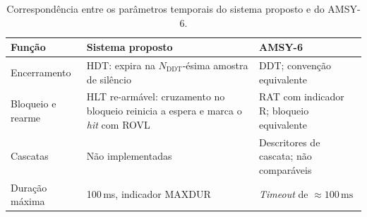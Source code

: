 \begin{table}[htbp]
	\centering
	\small
	\caption{Correspondência entre os parâmetros temporais do sistema proposto e do AMSY-6.}
	\label{tab:parametros_temporizacao}
	\begin{tabular}{L{0.20\textwidth}L{0.34\textwidth}L{0.36\textwidth}}
		\toprule
		\textbf{Função} & \textbf{Sistema proposto} & \textbf{AMSY-6} \\
		\midrule
		Encerramento & HDT: expira na \(N_{\mathrm{DDT}}\)-ésima amostra de silêncio & DDT; convenção equivalente \\
		Bloqueio e rearme & HLT re-armável: cruzamento no bloqueio reinicia a espera e marca o \textit{hit} com ROVL & RAT com indicador R; bloqueio equivalente \\
		Cascatas & Não implementadas & Descritores de cascata; não comparáveis \\
		Duração máxima & 100\,ms, indicador MAXDUR & \textit{Timeout} de \(\approx 100\,\mathrm{ms}\) \\
		\bottomrule
	\end{tabular}
\end{table}
